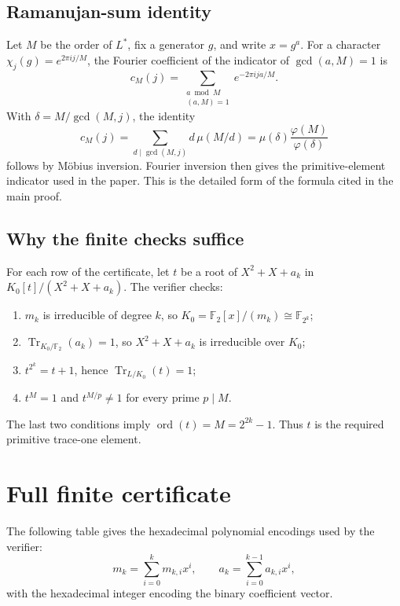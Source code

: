 \documentclass[11pt]{article}
\begin{document}
\subsection{Ramanujan-sum identity}
Let \(M\) be the order of \(L^*\), fix a generator \(g\), and write \(x=g^a\). For a character \(\chi_j(g)=e^{2\pi i j/M}\), the Fourier coefficient of the indicator of \(\gcd(a,M)=1\) is
\[
c_M(j)=\sum_{\substack{a\bmod M\\(a,M)=1}}e^{-2\pi ija/M}.
\]
With \(\delta=M/\gcd(M,j)\), the identity
\[
c_M(j)=\sum_{d\mid\gcd(M,j)}d\,\mu(M/d)=\mu(\delta)\frac{\varphi(M)}{\varphi(\delta)}
\]
follows by Möbius inversion. Fourier inversion then gives the primitive-element indicator used in the paper. This is the detailed form of the formula cited in the main proof.
\subsection{Why the finite checks suffice}
For each row of the certificate, let \(t\) be a root of \(X^2+X+a_k\) in \(K_0[t]/(X^2+X+a_k)\). The verifier checks:
\begin{enumerate}
\item \(m_k\) is irreducible of degree \(k\), so \(K_0=\mathbb F_2[x]/(m_k)\cong\mathbb F_{2^k}\);
\item \(\operatorname{Tr}_{K_0/\mathbb F_2}(a_k)=1\), so \(X^2+X+a_k\) is irreducible over \(K_0\);
\item \(t^{2^k}=t+1\), hence \(\operatorname{Tr}_{L/K_0}(t)=1\);
\item \(t^M=1\) and \(t^{M/p}\ne1\) for every prime \(p\mid M\).
\end{enumerate}
The last two conditions imply \(\operatorname{ord}(t)=M=2^{2k}-1\). Thus \(t\) is the required primitive trace-one element.
\section{Full finite certificate}
The following table gives the hexadecimal polynomial encodings used by the verifier:
\[
m_k=\sum_{i=0}^k m_{k,i}x^i,\qquad a_k=\sum_{i=0}^{k-1}a_{k,i}x^i,
\]
with the hexadecimal integer encoding the binary coefficient vector.
\end{document}
